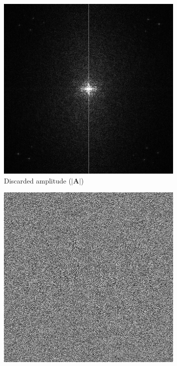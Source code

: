 \begin{figure}[H]
  \centering
  \begin{subfigure}[t]{0.3\textwidth}
    \centering
    \includegraphics[width=\textwidth]{Naive_discarded_amplitude.png}
    \caption{Discarded amplitude ($\vert \textbf{A}\vert$)}
    \label{fig:Naive_discarded_amplitude}
  \end{subfigure}
  \hfill
  \begin{subfigure}[t]{0.3\textwidth}
    \centering
    \includegraphics[width=\textwidth]{Naive_output_holo.png}

\end{subfigure}
\end{figure}
